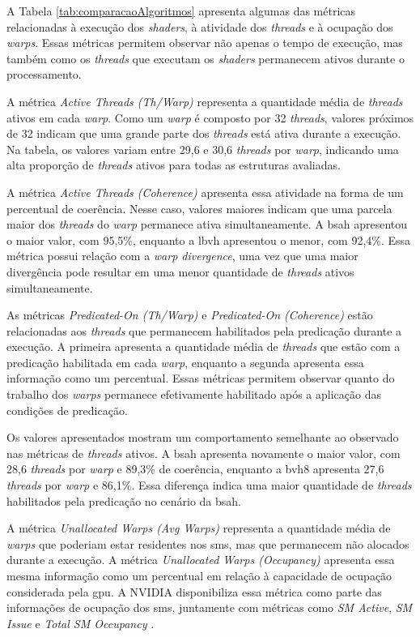 A Tabela \ref{tab:comparacaoAlgoritmos} apresenta algumas das métricas relacionadas à execução dos \textit{shaders}, à atividade dos \textit{threads} e à ocupação dos \textit{warps}. Essas métricas permitem observar não apenas o tempo de execução, mas também como os \textit{threads} que executam os \textit{shaders} permanecem ativos durante o processamento.

A métrica \textit{Active Threads (Th/Warp)} representa a quantidade média de \textit{threads} ativos em cada \textit{warp}. Como um \textit{warp} é composto por 32 \textit{threads}, valores próximos de 32 indicam que uma grande parte dos \textit{threads} está ativa durante a execução. Na tabela, os valores variam entre 29,6 e 30,6 \textit{threads} por \textit{warp}, indicando uma alta proporção de \textit{threads} ativos para todas as estruturas avaliadas.

A métrica \textit{Active Threads (Coherence)} apresenta essa atividade na forma de um percentual de coerência. Nesse caso, valores maiores indicam que uma parcela maior dos \textit{threads} do \textit{warp} permanece ativa simultaneamente. A \gls{bsah} apresentou o maior valor, com 95,5\%, enquanto a \gls{lbvh} apresentou o menor, com 92,4\%. Essa métrica possui relação com a \textit{warp divergence}, uma vez que uma maior divergência pode resultar em uma menor quantidade de \textit{threads} ativos simultaneamente.

As métricas \textit{Predicated-On (Th/Warp)} e \textit{Predicated-On (Coherence)} estão relacionadas aos \textit{threads} que permanecem habilitados pela predicação durante a execução. A primeira apresenta a quantidade média de \textit{threads} que estão com a predicação habilitada em cada \textit{warp}, enquanto a segunda apresenta essa informação como um percentual. Essas métricas permitem observar quanto do trabalho dos \textit{warps} permanece efetivamente habilitado após a aplicação das condições de predicação.

Os valores apresentados mostram um comportamento semelhante ao observado nas métricas de \textit{threads} ativos. A \gls{bsah} apresenta novamente o maior valor, com 28,6 \textit{threads} por \textit{warp} e 89,3\% de coerência, enquanto a \gls{bvh8} apresenta 27,6 \textit{threads} por \textit{warp} e 86,1\%. Essa diferença indica uma maior quantidade de \textit{threads} habilitados pela predicação no cenário da \gls{bsah}.

A métrica \textit{Unallocated Warps (Avg Warps)} representa a quantidade média de \textit{warps} que poderiam estar residentes nos \glspl{sm}, mas que permanecem não alocados durante a execução. A métrica \textit{Unallocated Warps (Occupancy)} apresenta essa mesma informação como um percentual em relação à capacidade de ocupação considerada pela \gls{gpu}. A NVIDIA disponibiliza essa métrica como parte das informações de ocupação dos \glspl{sm}, juntamente com métricas como \textit{SM Active}, \textit{SM Issue} e \textit{Total SM Occupancy} \cite{nvidia_nsight_systems}.

